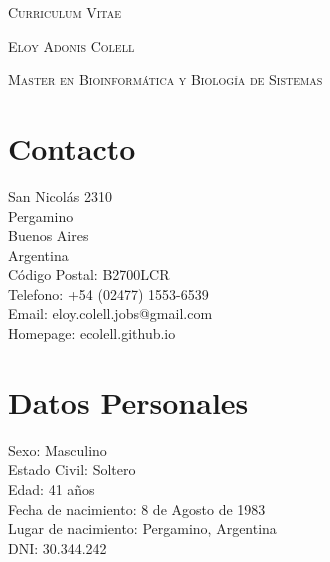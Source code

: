 \documentclass[a4paper]{article}
\begin{document}
\pagestyle{plain}

\begin{center}
\huge{\textsc{Curriculum Vitae}}
\vspace{\baselineskip}

\Large{\textsc{Eloy Adonis Colell}}
\vspace{\baselineskip}

\small{\textsc{Master en Bioinform{\'a}tica y Biolog{\'i}a de Sistemas}}
\end{center}
\vspace{1.5\baselineskip}

\section{Contacto}
\begin{flushleft}
San Nicol{\'a}s 2310 \\
Pergamino \\
Buenos Aires \\
Argentina \\
C{\'o}digo Postal: B2700LCR \\
Telefono: +54 (02477) 1553-6539 \\
Email: eloy.colell.jobs@gmail.com \\
Homepage: ecolell.github.io\\
\end{flushleft}

\section{Datos Personales}
\begin{flushleft}
Sexo: Masculino \\
Estado Civil: Soltero \\
Edad: 41 a\~{n}os \\
Fecha de nacimiento: 8 de Agosto de 1983 \\
Lugar de nacimiento: Pergamino, Argentina \\
DNI: 30.344.242 \\
\end{flushleft}
\end{document}
